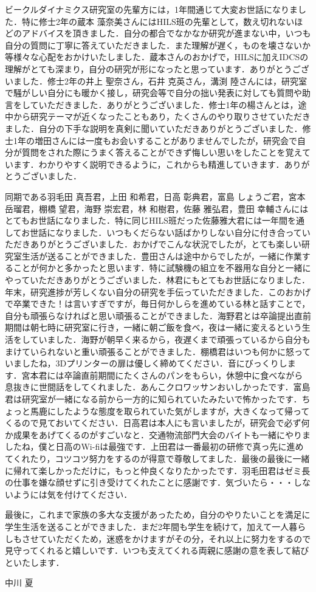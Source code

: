 \documentclass[a4paper,12pt]{article_vdlab_sotsuron}
\begin{document}
ビークルダイナミクス研究室の先輩方には，1年間通じて大変お世話になりました．特に修士2年の蔵本 藻奈美さんにはHILS班の先輩として，数え切れないほどのアドバイスを頂きました．自分の都合でなかなか研究が進まない中，いつも自分の質問に丁寧に答えていただきました．また理解が遅く，ものを壊さないか等様々な心配をおかけいたしました．蔵本さんのおかげで，HILSに加えIDCSの理解がとても深まり，自分の研究が形になったと思っています．ありがとうございました．修士2年の井上 聖奈さん，石井 克英さん，溝渕 陸さんには，研究室で騒がしい自分にも暖かく接し，研究会等で自分の拙い発表に対しても質問や助言をしていただきました．ありがとうございました．修士1年の楊さんとは，途中から研究テーマが近くなったこともあり，たくさんのやり取りさせていただきました．自分の下手な説明を真剣に聞いていただきありがとうございました．修士1年の増田さんには一度もお会いすることがありませんでしたが，研究会で自分が質問をされた際にうまく答えることができず悔しい思いをしたことを覚えています．わかりやすく説明できるように，これからも精進していきます．ありがとうございました．

同期である羽毛田 真吾君，上田 和希君，日高 彰典君，富島 しょうご君，宮本 岳瑠君，棚橋 望君，海野 崇宏君，林 和樹君，佐藤 雅弘君，豊田 幸輔さんにはとてもお世話になりました．特に同じHILS班だった佐藤雅大君には一年間を通してお世話になりました．いつもくだらない話ばかりしない自分に付き合っていただきありがとうございました．おかげでこんな状況でしたが，とても楽しい研究室生活が送ることができました．豊田さんは途中からでしたが，一緒に作業することが何かと多かったと思います．特に試験機の組立を不器用な自分と一緒にやっていただきありがとうございました．林君にもとてもお世話になりました．年末，研究進捗が芳しくない自分の研究を手伝っていただきました．このおかげで卒業できた！は言いすぎですが，毎日何かしらを進めている林と話すことで，自分も頑張らなければと思い頑張ることができました．海野君とは卒論提出直前期間は朝七時に研究室に行き，一緒に朝ご飯を食べ，夜は一緒に変えるという生活をしていました．海野が朝早く来るから，夜遅くまで頑張っているから自分もまけていられないと重い頑張ることができました．棚橋君はいつも何かに怒っていましたね，3Dプリンターの扉は優しく締めてください．音にびっくりします．宮本君には卒論直前期間にたくさんのパンをもらい，休憩中に食べながら息抜きに世間話をしてくれました．あんこクロワッサンおいしかったです．富島君は研究室が一緒になる前から一方的に知られていたみたいで怖かったです．ちょっと馬鹿にしたような態度を取られていた気がしますが，大きくなって帰ってくるので見ておいてください．日高君は本人にも言いましたが，研究会で必ず何か成果をあげてくるのがすごいなと．交通物流部門大会のバイトも一緒にやりましたね，僕と日高のWi-fiは最強です．上田君は一番最初の研修で真っ先に進めてくれたり，コツコツ努力をするのが得意で尊敬してました．最後の最後に一緒に帰れて楽しかっただけに，もっと仲良くなりたかったです．羽毛田君はゼミ長の仕事を嫌な顔せずに引き受けてくれたことに感謝です．気づいたら・・・しないようには気を付けてください．

最後に，これまで家族の多大な支援があったため，自分のやりたいことを満足に学生生活を送ることができました．まだ2年間も学生を続けて，加えて一人暮らしもさせていただくため，迷惑をかけますがその分，それ以上に努力をするので見守ってくれると嬉しいです．いつも支えてくれる両親に感謝の意を表して結びといたします．

\begin{flushright}
     中川 夏
\end{flushright}
\end{document}
